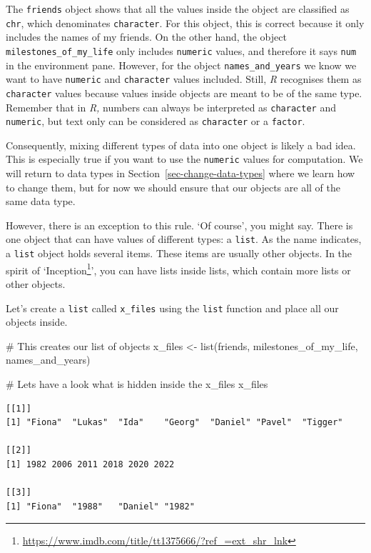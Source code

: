 \documentclass[
  letterpaper,
]{krantz}
\makeatletter
\newenvironment{Shaded}{\begin{snugshade}}{\end{snugshade}}
\newcommand{\CommentTok}[1]{\textcolor[rgb]{0.37,0.37,0.37}{#1}}
\newcommand{\FunctionTok}[1]{\textcolor[rgb]{0.28,0.35,0.67}{#1}}
\newcommand{\NormalTok}[1]{\textcolor[rgb]{0.00,0.23,0.31}{#1}}
\newcommand{\OtherTok}[1]{\textcolor[rgb]{0.00,0.23,0.31}{#1}}
\renewcommand{\href}[2]{#2\footnote{\url{#1}}}
\newenvironment{kframe}{%
\medskip{}
\setlength{\fboxsep}{.8em}
 \def\at@end@of@kframe{}%
 \ifinner\ifhmode%
  \def\at@end@of@kframe{\end{minipage}}%
  \begin{minipage}{\columnwidth}%
 \fi\fi%
 \def\FrameCommand##1{\hskip\@totalleftmargin \hskip-\fboxsep
 \colorbox{shadecolor}{##1}\hskip-\fboxsep
     \hskip-\linewidth \hskip-\@totalleftmargin \hskip\columnwidth}%
 \MakeFramed {\advance\hsize-\width
   \@totalleftmargin\z@ \linewidth\hsize
   \@setminipage}}%
 {\par\unskip\endMakeFramed%
 \at@end@of@kframe}
\renewenvironment{Shaded}{\begin{kframe}}{\end{kframe}}
\makeatother
\begin{document}
The \texttt{friends} object shows that all the values inside the object
are classified as \texttt{chr}, which denominates \texttt{character}.
For this object, this is correct because it only includes the names of
my friends. On the other hand, the object
\texttt{milestones\_of\_my\_life} only includes \texttt{numeric} values,
and therefore it says \texttt{num} in the environment pane. However, for
the object \texttt{names\_and\_years} we know we want to have
\texttt{numeric} and \texttt{character} values included. Still, \emph{R}
recognises them as \texttt{character} values because values inside
objects are meant to be of the same type. Remember that in \emph{R,}
numbers can always be interpreted as \texttt{character} and
\texttt{numeric}, but text only can be considered as \texttt{character}
or a \texttt{factor}.

Consequently, mixing different types of data into one object is likely a
bad idea. This is especially true if you want to use the
\texttt{numeric} values for computation. We will return to data types in
Section~\ref{sec-change-data-types} where we learn how to change them,
but for now we should ensure that our objects are all of the same data
type.

However, there is an exception to this rule. `Of course', you might say.
There is one object that can have values of different types: a
\texttt{list}. As the name indicates, a \texttt{list} object holds
several items. These items are usually other objects. In the spirit of
`\href{https://www.imdb.com/title/tt1375666/?ref_=ext_shr_lnk}{Inception}',
you can have lists inside lists, which contain more lists or other
objects.

Let's create a \texttt{list} called \texttt{x\_files} using the
\texttt{list} function and place all our objects inside.

\begin{Shaded}
\begin{Highlighting}[]
\CommentTok{\# This creates our list of objects}
\NormalTok{x\_files }\OtherTok{\textless{}{-}} \FunctionTok{list}\NormalTok{(friends,}
\NormalTok{                milestones\_of\_my\_life,}
\NormalTok{                names\_and\_years)}

\CommentTok{\# Let\textquotesingle{}s have a look what is hidden inside the x\_files}
\NormalTok{x\_files}
\end{Highlighting}
\end{Shaded}

\begin{verbatim}
[[1]]
[1] "Fiona"  "Lukas"  "Ida"    "Georg"  "Daniel" "Pavel"  "Tigger"

[[2]]
[1] 1982 2006 2011 2018 2020 2022

[[3]]
[1] "Fiona"  "1988"   "Daniel" "1982"  
\end{verbatim}
\end{document}
